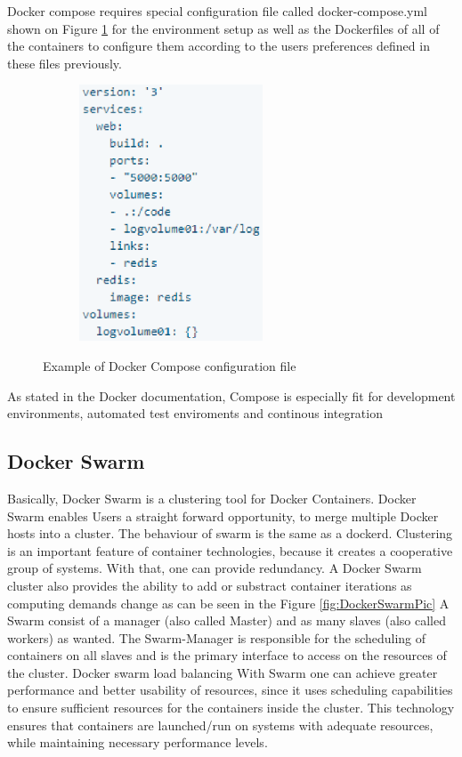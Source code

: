 Docker compose requires special configuration file called
docker-compose.yml shown on Figure \ref{fig:DockerComposeFilePic}
for the environment setup
as well as the Dockerfiles of all of the
containers to configure them according to the users
preferences defined in these files previously.\cite{DockerCompose}

\begin{figure}
\includegraphics[height=3in, width=3in]{DockerComposeExample}
\caption{Example of Docker Compose configuration file}
\cite{DockerComposeFilePic}
\label{fig:DockerComposeFilePic}
\end{figure}

As stated in the Docker documentation, Compose is especially
fit for development environments,
automated test enviroments and continous integration

\subsection{Docker Swarm}

Basically, Docker Swarm is a clustering tool for Docker Containers.
Docker Swarm enables Users a straight forward opportunity,
to merge multiple Docker hosts into a cluster.\cite{DockerSwarmDefinition}
The behaviour of swarm is the same as a dockerd.
Clustering is an important feature of container technologies,
because it creates a cooperative group of systems.
With that, one can provide redundancy.
A Docker Swarm cluster also provides the
ability to add or substract container iterations as computing demands change
as can be seen in the Figure \ref{fig:DockerSwarmPic}
A Swarm consist of a manager (also called Master) and
as many slaves (also called workers) as wanted.
The Swarm-Manager is responsible for the scheduling
of containers on all slaves and is the primary
interface to access on the resources of the cluster.\cite{DockerSwarmKeyConcepts}
Docker swarm load balancing
With Swarm one can achieve greater performance and
better usability of resources, since it uses
scheduling capabilities to ensure sufficient resources for
the containers inside the cluster. This technology ensures that containers
are launched/run on systems with adequate resources, while maintaining
necessary performance levels.\cite{DockerSwarmHowNodesWork}

